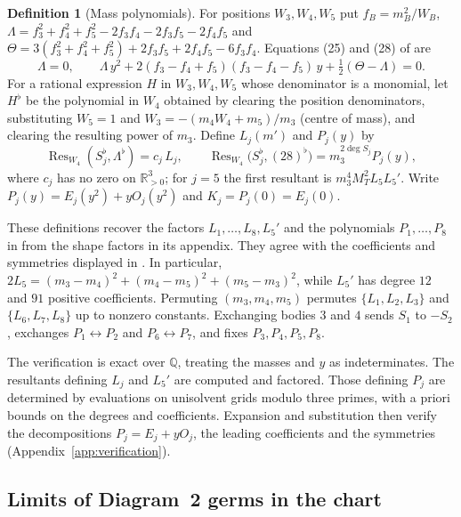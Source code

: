 \documentclass[11pt]{amsart}
\theoremstyle{definition}
\newtheorem{definition}[theorem]{Definition}
\theoremstyle{remark}
\newcommand{\Rp}{\mathbb{R}_{>0}}
\begin{document}
\begin{definition}[Mass polynomials]\label{def:d2-mass}
For positions $W_3,W_4,W_5$ put $f_B=m_B^2/W_B$,
$\Lambda=f_3^2+f_4^2+f_5^2-2f_3f_4-2f_3f_5-2f_4f_5$ and
$\Theta=3(f_3^2+f_4^2+f_5^2)+2f_3f_5+2f_4f_5-6f_3f_4$.  Equations (25) and (28) of
\cite[\S8.2]{AK} are
\begin{equation}\label{eq:d2-25-28}
  \Lambda=0,\qquad
  \Lambda\,y^2+2(f_3-f_4+f_5)(f_3-f_4-f_5)\,y+\tfrac12(\Theta-\Lambda)=0 .
\end{equation}
For a rational expression $H$ in $W_3,W_4,W_5$ whose denominator is a monomial, let $H^\flat$ be
the polynomial in $W_4$ obtained by clearing the position denominators, substituting $W_5=1$ and
$W_3=-(m_4W_4+m_5)/m_3$ (centre of mass), and clearing the resulting power of $m_3$.  Define
$L_j(m')$ and $P_j(y)$ by
\[
  \operatorname{Res}_{W_4}(S_j^\flat,\Lambda^\flat)=c_j\,L_j,\qquad
  \operatorname{Res}_{W_4}\bigl(S_j^\flat,(28)^\flat\bigr)=m_3^{2\deg S_j}P_j(y),
\]
where $c_j$ has no zero on $\Rp^3$; for $j=5$ the first resultant is
$m_3^4M_T^2L_5L_5'$.  Write $P_j(y)=E_j(y^2)+yO_j(y^2)$ and $K_j=P_j(0)=E_j(0)$.
\end{definition}

{These definitions recover the factors $L_1,\dots,L_8,L_5'$ and the
polynomials $P_1,\dots,P_8$ in \cite[pp.~573--575]{AK} from the shape factors in its appendix.
They agree with the coefficients and symmetries displayed in \cite{AK}.
In particular, $2L_5=(m_3-m_4)^2+(m_4-m_5)^2+(m_5-m_3)^2$, while $L_5'$ has degree $12$
and $91$ positive coefficients.
Permuting $(m_3,m_4,m_5)$ permutes $\{L_1,L_2,L_3\}$ and $\{L_6,L_7,L_8\}$ up to nonzero
constants.  Exchanging bodies $3$ and $4$ sends $S_1$ to $-S_2$, exchanges
$P_1\leftrightarrow P_2$ and $P_6\leftrightarrow P_7$, and fixes $P_3,P_4,P_5,P_8$.}

{The verification is exact over $\mathbb Q$, treating the masses and
$y$ as indeterminates.  The resultants defining $L_j$ and $L_5'$ are computed and factored.
Those defining $P_j$ are determined by evaluations on unisolvent grids modulo three primes,
with a priori bounds on the degrees and coefficients.  Expansion and substitution then
verify the decompositions $P_j=E_j+yO_j$, the leading coefficients and the symmetries
(Appendix~\ref{app:verification}).}
\subsection{\texorpdfstring{Limits of Diagram~2 germs in the chart}{Limits of Diagram 2 germs in the chart}}\label{sec:d2-cover}
\end{document}

